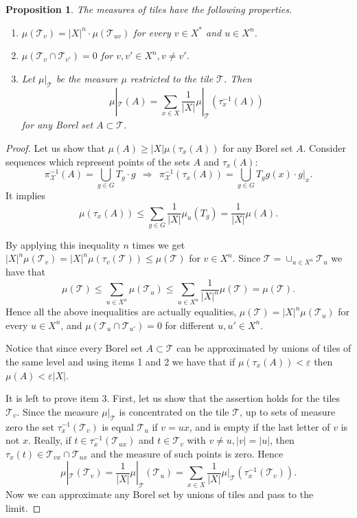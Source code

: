 \documentclass[12pt]{article}
\newcommand{\limGs}[1][G]{\mathcal{X}_{#1}}
\newcommand{\tile}{\mathscr{T}}
\newtheorem{prop}[theor]{Proposition}
\theoremstyle{definition}
\begin{document}
\begin{prop}\label{prop_measure lims propert}
The measures of tiles have the following properties.
\begin{enumerate}
  \item $\mu(\tile_v)= |X|^n\cdot\mu(\tile_{uv})$ for every $v\in X^{*}$ and $u\in X^n$.
  \item $\mu(\tile_v\cap\tile_{v'})=0$ for $v,v'\in X^n, v\neq v'$.
  \item Let $\mu|_{\tile}$ be the measure $\mu$ restricted to the tile $\tile$. Then
\[
  \mu|_{\tile}(A)=\sum_{x\in X} \frac{1}{|X|}\mu|_{\tile}(\tau_x^{-1}(A))
\]
for any Borel set $A\subset\tile$.
\end{enumerate}
\end{prop}
\begin{proof}
Let us show that $\mu(A)\geq |X|\mu(\tau_x(A))$ for any Borel set $A$. Consider sequences which
represent points of the sets $A$ and $\tau_x(A)$:
\[
\pi^{-1}_{\limGs[]}(A)=\bigcup_{g\in G}T_g\cdot g \ \ \Rightarrow \ \
\pi^{-1}_{\limGs[]}(\tau_x(A))=\bigcup_{g\in G}T_g g(x)\cdot g|_x.
\]
It implies
\[
\mu(\tau_x(A))\leq \sum_{g\in G} \frac{1}{|X|}\mu_u (T_g)=\frac{1}{|X|}\mu(A).
\]

By applying this inequality $n$ times we get
$|X|^n\mu(\tile_v)=|X|^n\mu(\tau_v(\tile))\leq\mu(\tile)$ for $v\in{X}^n$. Since $\tile=\cup_{u\in
X^n}\tile_{u}$ we have that
\[
\mu(\tile)\leq\sum_{u\in X^n}\mu(\tile_{u})\leq\sum_{u\in X^n}\frac{1}{|X|^n}\mu(\tile)=\mu(\tile).
\]
Hence all the above inequalities are actually equalities, $\mu(\tile)=|X|^n\mu(\tile_{u})$ for
every $u\in X^n$, and $\mu(\tile_u\cap\tile_{u'})=0$ for different $u,u'\in X^n$.

Notice that since every Borel set $A\subset\tile$ can be approximated by unions of tiles of the
same level %
and using items 1 and 2 we have that if $\mu(\tau_x(A))<\varepsilon$ then $\mu(A)<\varepsilon|X|$.

It is left to prove item 3. First, let us show that the assertion holds for the tiles $\tile_v$.
Since the measure $\mu|_{\tile}$ is concentrated on the tile $\tile$, up to sets of measure zero
the set $\tau_x^{-1}(\tile_v)$ is equal $\tile_u$ if $v=ux$, and is empty if the last letter of $v$
is not $x$. Really, if $t\in\tau_x^{-1}(\tile_{ux})$ and $t\in\tile_v$ with $v\neq u, |v|=|u|$,
then $\tau_x(t)\in\tile_{vx}\cap\tile_{ux}$ and the measure of such points is zero. Hence
\[
\mu|_{\tile}(\tile_v)=\frac{1}{|X|}\mu|_{\tile}(\tile_u)=\sum_{x\in X}
\frac{1}{|X|}\mu|_{\tile}(\tau_x^{-1}(\tile_v)).
\]
Now we can approximate any Borel set by unions of tiles and pass to the limit.
\end{proof}
\end{document}
